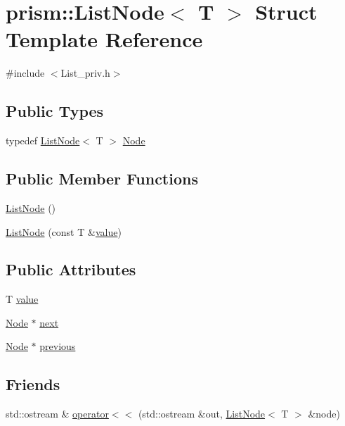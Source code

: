 \hypertarget{structprism_1_1_list_node}{}\section{prism\+:\+:List\+Node$<$ T $>$ Struct Template Reference}
\label{structprism_1_1_list_node}


{\ttfamily \#include $<$List\+\_\+priv.\+h$>$}

\subsection*{Public Types}
\begin{DoxyCompactItemize}
\item 
typedef \hyperlink{structprism_1_1_list_node}{List\+Node}$<$ T $>$ \hyperlink{structprism_1_1_list_node_a8c91088352214e1e7e347e0db6aaf398}{Node}
\end{DoxyCompactItemize}
\subsection*{Public Member Functions}
\begin{DoxyCompactItemize}
\item 
\hyperlink{structprism_1_1_list_node_ae6a5c202a5ebb4e5155621184b7f44ac}{List\+Node} ()
\item 
\hyperlink{structprism_1_1_list_node_a7c4596468843454cc5f7219e162e7d2a}{List\+Node} (const T \&\hyperlink{structprism_1_1_list_node_a7e32dda6d1af7a226aced3240b4ef42d}{value})
\end{DoxyCompactItemize}
\subsection*{Public Attributes}
\begin{DoxyCompactItemize}
\item 
T \hyperlink{structprism_1_1_list_node_a7e32dda6d1af7a226aced3240b4ef42d}{value}
\item 
\hyperlink{structprism_1_1_list_node_a8c91088352214e1e7e347e0db6aaf398}{Node} $\ast$ \hyperlink{structprism_1_1_list_node_a5ca2fb598c2a27a5fc116c17955c7ddb}{next}
\item 
\hyperlink{structprism_1_1_list_node_a8c91088352214e1e7e347e0db6aaf398}{Node} $\ast$ \hyperlink{structprism_1_1_list_node_a0c9c6c66b2fc2330dc001277902c6c5f}{previous}
\end{DoxyCompactItemize}
\subsection*{Friends}
\begin{DoxyCompactItemize}
\item 
std\+::ostream \& \hyperlink{structprism_1_1_list_node_a729298c247b9f8065872fdb742a1a38c}{operator$<$$<$} (std\+::ostream \&out, \hyperlink{structprism_1_1_list_node}{List\+Node}$<$ T $>$ \&node)
\end{DoxyCompactItemize}


